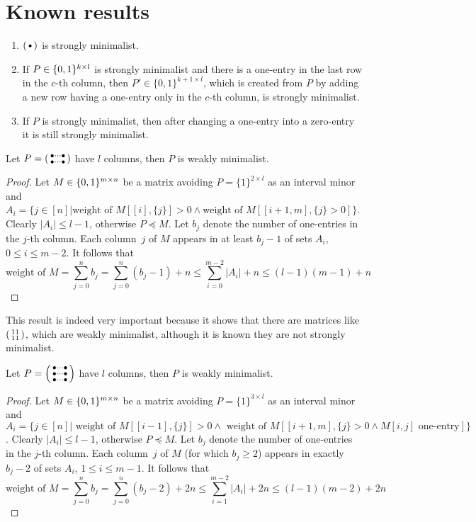 \section{Known results}
\begin{fct}
\begin{enumerate}
\item $\left(\begin{smallmatrix}\bullet\end{smallmatrix}\right)$ is strongly minimalist.
\item If $P\in\{0,1\}^{k\times l}$ is strongly minimalist and there is a one-entry in the last row in the $c$-th column, then $P'\in\{0,1\}^{k+1\times l}$, which is created from $P$ by adding a new row having a one-entry only in the $c$-th column, is strongly minimalist.
\item If $P$ is strongly minimalist, then after changing a one-entry into a zero-entry it is still strongly minimalist.
\end{enumerate}
\end{fct}
\begin{fct}
Let $P=\left(\begin{smallmatrix}\bullet\dots\bullet\\\bullet\dots\bullet\end{smallmatrix}\right)$ have $l$ columns, then $P$ is weakly minimalist.
\end{fct}
\begin{proof}
Let $M\in\{0,1\}^{m\times n}$ be a matrix avoiding $P=\{1\}^{2\times l}$ as an interval minor and $A_i=\{j\in[n]|\text{weight of }M[[i],\{j\}]>0\wedge \text{weight of }M[[i+1,m],\{j\}>0]\}$. Clearly $|A_i|\leq l-1$, otherwise $P\preceq M$. Let $b_j$ denote the number of one-entries in the $j$-th column. Each column~$j$ of $M$ appears in at least $b_j-1$ of sets $A_i$, $0\leq i\leq m-2$. It follows that
$$\text{weight of }M=\sum\limits_{j=0}^nb_j=\sum\limits_{j=0}^n(b_j-1)+n\leq\sum\limits_{i=0}^{m-2}|A_i|+n\leq(l-1)(m-1)+n$$
\end{proof}
This result is indeed very important because it shows that there are matrices like $\left(\begin{smallmatrix}11\\11\end{smallmatrix}\right)$, which are weakly minimalist, although it is known they are not strongly minimalist.
\begin{fct}
Let $P=\left(\begin{smallmatrix}\bullet\dots\bullet\\\bullet\dots\bullet\\\bullet\dots\bullet\end{smallmatrix}\right)$ have $l$ columns, then $P$ is weakly minimalist.
\end{fct}
\begin{proof}
Let $M\in\{0,1\}^{m\times n}$ be a matrix avoiding $P=\{1\}^{3\times l}$ as an interval minor and $A_i=\{j\in[n]|\text{ weight of }M[[i-1],\{j\}]>0\wedge \text{ weight of }M[[i+1,m],\{j\}>0\wedge M[i,j]\text{ one-entry}]\}$. Clearly $|A_i|\leq l-1$, otherwise $P\preceq M$. Let $b_j$ denote the number of one-entries in the $j$-th column. Each column~$j$ of $M$ (for which $b_j\geq2$) appears in exactly $b_j-2$ of sets $A_i$, $1\leq i\leq m-1$. It follows that
$$\text{weight of }M=\sum\limits_{j=0}^nb_j=\sum\limits_{j=0}^n(b_j-2)+2n\leq\sum\limits_{i=1}^{m-2}|A_i|+2n\leq(l-1)(m-2)+2n$$
\end{proof}